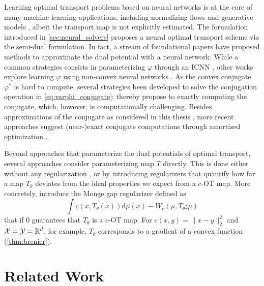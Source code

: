 Learning optimal transport problems based on neural networks is at the core of many machine learning applications, including normalizing flows \citep{rezende2015variational,huang2021convex} and generative models \citep{arjovsky2017wasserstein, genevay2018learning}, albeit the transport map is not explicitly estimated.
The formulation introduced in \cref{sec:neural_solvers} proposes a neural optimal transport scheme via the semi-dual formulation. In fact, a stream of foundational papers have proposed methods to approximate the dual potential with a neural network.
While a common strategies consists in parameterizing $\varphi$ through an \acrshort{ICNN} \citep{taghvaei20192, korotin2021wasserstein, makkuva2020optimal}, other works explore learning $\varphi$ using non-convex neural networks \citep{korotin2021neural, rout2021generative, nhan2019three}.
As the convex conjugate $\varphi^*$ is hard to compute, several strategies been developed to solve the conjugation operation in \eqref{eq:varphi_conjugate}: \citet{taghvaei20192} thereby propose to exactly computing the conjugate, which, however, is computationally challenging. Besides approximations of the conjugate as considered in this thesis \citep{korotin2021wasserstein, makkuva2020optimal}, more recent approaches suggest (near-)exact conjugate computations through  amortized optimization \citep{amos2023amortizing}.

Beyond approaches that parameterize the dual potentials of optimal transport, several approaches consider parameterizing map $T$ directly. This is done either without any regularization \citep{yang2018scalable}, or by introducing regularizers that quantify how far a map $T_\theta$ deviates from the ideal properties we expect from a $c$-OT map.
More concretely, \citet{uscidda2023monge} introduce the Monge gap regularizer defined as
\begin{equation*}
	\int c(x, T_\theta(x)) \textrm{d} \mu(x) - W_c(\mu, T_\theta \sharp \mu)
\end{equation*}
that if 0 guarantees that $T_\theta$ is a $c$-OT map. For $c(x,y) = \|x-y\|^2_2$ and ${\mathcal{X}} = {\mathcal{Y}} = \mathbb{R}^d$, for example, $T_\theta$ corresponds to a gradient of a convex function (\cref{thm:brenier}).


\section{Related Work}

